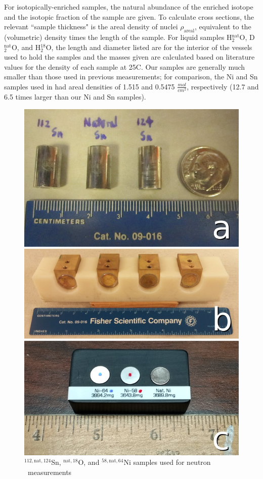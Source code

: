 For isotopically-enriched samples, the natural abundance
        of the enriched isotope and the isotopic fraction of the sample are
        given. To calculate cross sections, the relevant ``sample thickness" is the areal
        density of nuclei $\rho_{\text{areal}}$, equivalent to
        the (volumetric) density times the length of the sample. For liquid
        samples H$_{2}^{\text{nat}}$O, D$_{2}^{\text{nat}}$O, and H$_{2}^{18}$O,
        the length and diameter listed are for the interior of the vessels
        used to hold the samples and the masses given are calculated based on 
        literature values for the density of each sample at 25\textdegree{}C.
        Our samples are generally much smaller than those used in previous
        measurements; for comparison, the Ni and Sn samples used in \cite{Abfalterer2001,
        Finlay1993} had areal densities of 1.515 and 0.5475
        $\frac{mol}{cm^{2}}$, respectively (12.7 and 6.5 times larger than our
    Ni and Sn samples).

\begin{figure}
    \includegraphics[scale=0.23]{figures/AllIsotopicSamples.jpg}
    \caption{${^{112,\text{nat},124}}$Sn, $^{{\text{nat}, 18}}$O, and ${^{58,\text{nat},64}}$Ni
samples used for neutron \tot\ measurements}
    \label{SamplesImage}
\end{figure}

